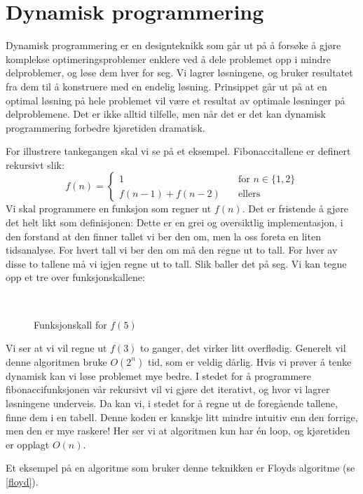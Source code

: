 \section{Dynamisk programmering}
Dynamisk programmering er en designteknikk som går ut på å forsøke å gjøre komplekse optimeringsproblemer enklere ved å dele problemet opp i mindre delproblemer, og løse dem hver for seg. Vi lagrer løsningene, og bruker resultatet fra dem til å konstruere med en endelig løsning. Prinsippet går ut på at en optimal løsning på hele problemet vil være et resultat av optimale løsninger på delproblemene. Det er ikke alltid tilfelle, men når det er det kan dynamisk programmering forbedre kjøretiden dramatisk.

For illustrere tankegangen skal vi se på et eksempel. Fibonaccitallene er definert rekursivt slik:
\[ f(n) =	\left\{
	\begin{array}{ll}
		1 \quad& \text{for } n \in \{1, 2\} \\
		f(n-1) + f(n-2) \quad& \text{ellers} 
	\end{array}
	\right. \]
Vi skal programmere en funksjon som regner ut $ f(n) $. Det er fristende å gjøre det helt likt som definisjonen:
Dette er en grei og oversiktlig implementasjon, i den forstand at den finner tallet vi ber den om, men la oss foreta en liten tidsanalyse. For hvert tall vi ber den om må den regne ut to tall. For hver av disse to tallene må vi igjen regne ut to tall. Slik baller det på seg. Vi kan tegne opp et tre over funksjonskallene:

\begin{figure}[h!tb]
\caption{Funksjonskall for $ f(5) $}
\label{fig:fib_rekursivt}
\centering
~\\
\end{figure}

Vi ser at vi vil regne ut $ f(3) $ to ganger, det virker litt overflødig. Generelt vil denne algoritmen bruke $ O(2^n) $ tid, som er veldig dårlig. Hvis vi prøver å tenke dynamisk kan vi løse problemet mye bedre. I stedet for å programmere fibonaccifunksjonen vår rekursivt vil vi gjøre det iterativt, og hvor vi lagrer løsningene underveis. Da kan vi, i stedet for å regne ut de foregående tallene, finne dem i en tabell. 
Denne koden er kanskje litt mindre intuitiv enn den forrige, men den er mye raskere! Her ser vi at algoritmen kun har én loop, og kjøretiden er opplagt $ O(n) $.

Et eksempel på en algoritme som bruker denne teknikken er Floyds algoritme (se \ref{floyd}).
